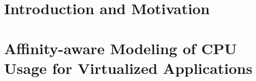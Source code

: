 \documentclass[12pt, a4paper, twoside]{article}
\begin{document}
\def\title{Towards Improved Provisioning and Utilization of Resources in Virtualized Environments}
\def\what{Synopsis}
\def\degree{Doctor of Philosophy}
\def\who{Sujesha Sudevalayam}
\def\roll{07305903}
\def\guide{Prof. Purushottam Kulkarni}

\titlpage
\def\bsq{\begin{flushright} $\blacksquare$\\ \end{flushright}}
\def\tab{\hspace{5mm}}

\printnomenclature

\newpage
{}

\onehalfspace

\section{Introduction and Motivation} 
\label{sec:synopsis-intro}


\newpage
\section{Affinity-aware Modeling of CPU Usage for Virtualized Applications}
\label{sec:synopsis-arescue}


%
%
\end{document}
